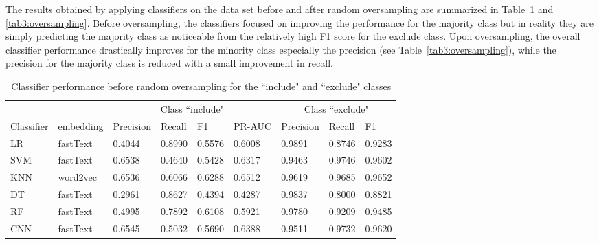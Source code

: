 \documentclass{IOS-Book-Article}
\begin{document}
The results obtained by applying classifiers on the data set before and after random oversampling are summarized in Table~\ref{tab2:no_oversampling} and \ref{tab3:oversampling}.
Before oversampling, the classifiers focused on improving the performance for the majority class but in reality they are simply predicting the majority class as noticeable from the relatively high F1 score for the exclude class.
Upon oversampling, the overall classifier performance drastically improves for the minority class especially the precision (see Table~\ref{tab3:oversampling}), while the precision for the majority class is reduced with a small improvement in recall.
%
\begin{table}[h]
    \centering
     \begin{tabular}{ p{1cm}p{1.2cm}|p{0.9cm}p{0.8cm}p{0.7cm}p{1.1cm}|p{0.9cm}p{0.8cm}p{0.7cm}  }
       \multicolumn{2}{c|}{} &  
       \multicolumn{4}{c|}{Class ``include"} &  
       \multicolumn{3}{c}{Class ``exclude"}\\
     Classifier & embedding & Precision & Recall & F1 & PR-AUC & Precision & Recall & F1\\
     \hline
     LR  &   fastText  & 0.4044   & 0.8990 & 0.5576 & 0.6008 &   0.9891  & 0.8746 & 0.9283 \\
     SVM    & fastText & 0.6538 &  0.4640 &   0.5428 & 0.6317 & 0.9463 & 0.9746 & 0.9602 \\
     KNN    & word2vec & 0.6536 &  0.6066 &   0.6288 & 0.6512 & 0.9619 & 0.9685 & 0.9652 \\
     DT &   fastText  & 0.2961 & 0.8627 &   0.4394 & 0.4287  & 0.9837 & 0.8000 & 0.8821 \\
     RF  & fastText  & 0.4995   & 0.7892 & 0.6108 & 0.5921 & 0.9780 & 0.9209 & 0.9485 \\
     CNN    & fastText  & 0.6545 & 0.5032 & 0.5690 & 0.6388 & 0.9511 & 0.9732 & 0.9620 \\
     \hline
     \end{tabular}
    \caption{Classifier performance before random oversampling for the ``include" and ``exclude" classes}
    \label{tab2:no_oversampling}
\end{table}
\end{document}
